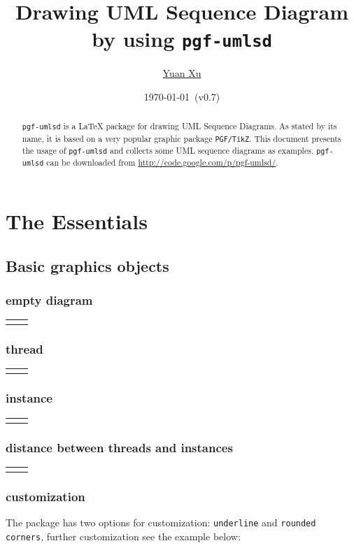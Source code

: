 \documentclass{article}
\newcommand{\demo}[2][1]{
  \begin{center}
  \begin{tabular}{cc}
    \begin{minipage}{.49\linewidth}
      \centering
      \resizebox{#1\linewidth}{!}{
        
      }
    \end{minipage}
    &
    \begin{minipage}{.45\linewidth}
      
    \end{minipage}
  \end{tabular}
  \end{center}
}
\begin{document}
\title{Drawing UML Sequence Diagram by using \texttt{pgf-umlsd}}
\author{\href{mailto:xuyuan.cn@gmail.com}{Yuan Xu}}
\date{\today{}~(v0.7)}
\maketitle

\begin{abstract}
  \texttt{pgf-umlsd} is a LaTeX package for drawing UML Sequence
  Diagrams. As stated by its name, it is based on a very popular
  graphic package \texttt{PGF/TikZ}. This document presents the usage
  of \texttt{pgf-umlsd} and collects some UML sequence diagrams as
  examples. \texttt{pgf-umlsd} can be downloaded from
  \href{http://code.google.com/p/pgf-umlsd/}{http://code.google.com/p/pgf-umlsd/}.
\end{abstract}

\tableofcontents

\section{The Essentials}
\subsection{Basic graphics objects}
\subsubsection{empty diagram}
\demo{empty}

\subsubsection{thread}
\demo[0.3]{thread}

\subsubsection{instance}
\demo[0.3]{instance}

\subsubsection{distance between threads and instances}
\demo{distance}

\subsubsection{customization}
The package has two options for customization: \texttt{underline} and
\texttt{rounded corners}, further customization see the example below:
\end{document}
